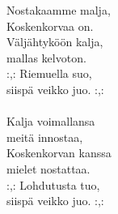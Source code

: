 
Nostakaamme malja, \\ Koskenkorvaa on. \\ Väljähtyköön kalja, \\ mallas kelvoton. \\ :,: Riemuella suo, \\ siispä veikko juo. :,: \\ \hspace{10mm} \\ Kalja voimallansa \\ meitä innostaa, \\ Koskenkorvan kanssa \\ mielet nostattaa. \\ :,: Lohdutusta tuo, \\ siispä veikko juo. :,: